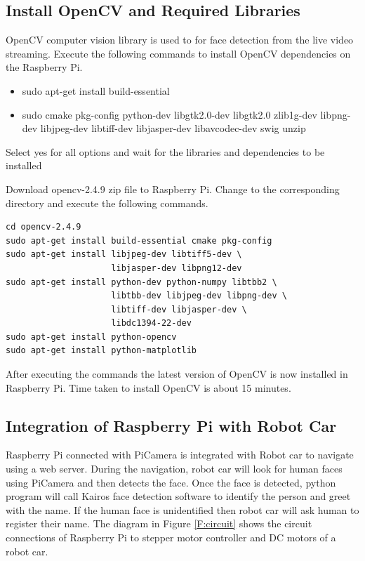 \documentclass[sigconf]{acmart}
\begin{document}
\subsection{Install OpenCV and Required Libraries}
OpenCV computer vision library is used to for face detection from the live video streaming. Execute the following commands to install OpenCV dependencies on the Raspberry Pi.

\begin{itemize}
\item sudo apt-get install build-essential
\item sudo cmake pkg-config python-dev libgtk2.0-dev libgtk2.0 zlib1g-dev libpng-dev libjpeg-dev libtiff-dev libjasper-dev libavcodec-dev swig unzip
\end{itemize}
Select yes for all options and wait for the libraries and dependencies to be installed


Download opencv-2.4.9 zip file to Raspberry Pi. Change to the corresponding directory and execute the following commands.

\begin{verbatim}
cd opencv-2.4.9
sudo apt-get install build-essential cmake pkg-config
sudo apt-get install libjpeg-dev libtiff5-dev \
                     libjasper-dev libpng12-dev
sudo apt-get install python-dev python-numpy libtbb2 \ 
                     libtbb-dev libjpeg-dev libpng-dev \ 
                     libtiff-dev libjasper-dev \ 
                     libdc1394-22-dev
sudo apt-get install python-opencv
sudo apt-get install python-matplotlib

\end{verbatim}

After executing the commands the latest version of OpenCV is now installed in Raspberry Pi. Time taken to install OpenCV is about 15 minutes.

\subsection{Integration of Raspberry Pi with Robot Car}
Raspberry Pi connected with PiCamera is integrated with Robot car to navigate using a web server. During the navigation, robot car will look for human faces using PiCamera and then detects the face. Once the face is detected, python program will call Kairos face detection software to identify the person and greet with the name. If the human face is unidentified then robot car will ask human to register their name.
The diagram in Figure \ref{F:circuit} shows the circuit connections of Raspberry Pi to stepper motor controller and DC motors of a robot car.
\end{document}
